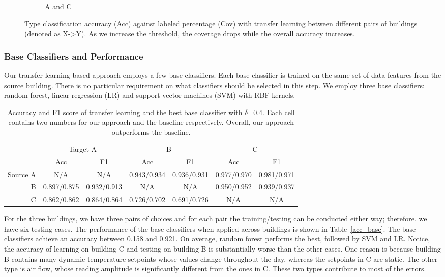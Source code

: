 \begin{figure}[ht!]
\begin{subfigure}{0.32\textwidth}
                \caption{A and C}
  \end{subfigure}
\caption{Type classification accuracy (Acc) against labeled percentage (Cov) with transfer learning between different pairs of buildings (denoted as X->Y). As we increase the threshold, the coverage drops while the overall accuracy increases. }
\label{fig:tl_acc}
\end{figure}

\subsubsection{Base Classifiers and Performance}
\label{sec:baseline}
Our transfer learning based approach employs a few base classifiers. Each base classifier is trained on the same set of data features from the source building. There is no particular requirement on 
what classifiers should be selected in this step.  
We employ three base classifiers: random forest, linear regression (LR) and support vector machines (SVM) with RBF kernels.


\begin{table}[]
\centering
\begin{tabular}{r|c|c|c|c|c|c}
\hline
\multirow{2}{*}{} & \multicolumn{2}{c|}{Target A} & \multicolumn{2}{c|}{B} & \multicolumn{2}{c}{C} \\ \cline{2-7} 
                  & Acc        & F1        & Acc        & F1        & Acc        & F1        \\ \hline
Source A                 & N/A      & N/A     & 0.943/0.934      & 0.936/0.931     & 0.977/0.970      & 0.981/0.971     \\ \hline
B                 & 0.897/0.875     & 0.932/0.913     & N/A      & N/A     & 0.950/0.952      & 0.939/0.937     \\ \hline
C                 & 0.862/0.862     & 0.864/0.864     & 0.726/0.702      & 0.691/0.726     & N/A     & N/A     \\ \hline
\end{tabular}
\caption{Accuracy and F1 score of transfer learning and the best base classifier with $\delta$=0.4. Each cell contains two numbers for our approach and the baseline respectively. Overall, our approach outperforms the baseline.}
\label{table:f1}
\end{table}

For the three buildings, we have three pairs of choices and for each pair the training/testing can be conducted either way; therefore, we have six testing cases.
The performance of the base classifiers when applied across buildings is shown in Table~\ref{acc_base}.  The base classifiers achieve an accuracy between 0.158 and 0.921.
On average, random forest performs the best, followed by SVM and LR. 
Notice, the accuracy of learning on building C and testing on building B is substantially worse than the other cases. 
One reason is because building B contains many dynamic temperature setpoints whose values change throughout the day, whereas the setpoints in C are static. 
The other type is air flow, whose reading amplitude is significantly different from the ones in C. These two types contribute to most of the errors. %


